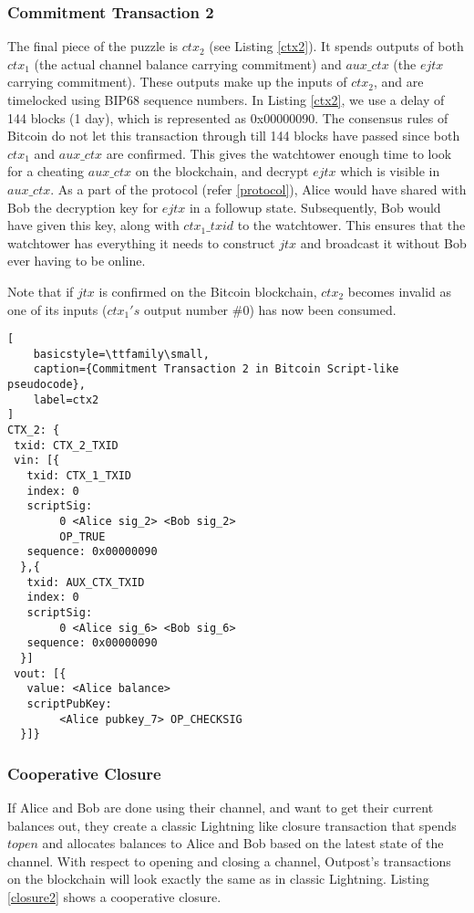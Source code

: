 \subsubsection{Commitment Transaction 2}
The final piece of the puzzle is $\mathit{ctx_2}$ (see Listing \ref{ctx2}). It spends outputs of both $\mathit{ctx_1}$ (the actual channel balance carrying commitment) and $\mathit{aux\_ctx}$ (the $\mathit{ejtx}$ carrying commitment). These outputs make up the inputs of $\mathit{ctx_2}$, and are timelocked using BIP68 \cite{BIP68} sequence numbers. In Listing \ref{ctx2}, we use a delay of 144 blocks (1 day), which is represented as 0x00000090. The consensus rules of Bitcoin do not let this transaction through till 144 blocks have passed since both $\mathit{ctx_1}$ and $\mathit{aux\_ctx}$ are confirmed. This gives the watchtower enough time to look for a cheating $\mathit{aux\_ctx}$ on the blockchain, and decrypt $\mathit{ejtx}$ which is visible in $\mathit{aux\_ctx}$. As a part of the protocol (refer \ref{protocol}), Alice would have shared with Bob the decryption key for $\mathit{ejtx}$ in a followup state. Subsequently, Bob would have given this key, along with $\mathit{ctx_1\_txid}$ to the watchtower. This ensures that the watchtower has everything it needs to construct $\mathit{jtx}$ and broadcast it without Bob ever having to be online. 

Note that if $\mathit{jtx}$ is confirmed on the Bitcoin blockchain, $\mathit{ctx_2}$ becomes invalid as one of its inputs ($\mathit{ctx_1's}$ output number \#0) has now been consumed. 

\begin{lstlisting}[
    basicstyle=\ttfamily\small,
    caption={Commitment Transaction 2 in Bitcoin Script-like pseudocode},
    label=ctx2
]
CTX_2: {
 txid: CTX_2_TXID
 vin: [{
   txid: CTX_1_TXID
   index: 0
   scriptSig: 
        0 <Alice sig_2> <Bob sig_2>
        OP_TRUE
   sequence: 0x00000090
  },{
   txid: AUX_CTX_TXID
   index: 0
   scriptSig: 
        0 <Alice sig_6> <Bob sig_6>
   sequence: 0x00000090
  }]
 vout: [{
   value: <Alice balance>
   scriptPubKey: 
        <Alice pubkey_7> OP_CHECKSIG
  }]}
\end{lstlisting}

\subsubsection{Cooperative Closure}
If Alice and Bob are done using their channel, and want to get their current balances out, they create a classic Lightning like closure transaction that spends $\mathit{topen}$ and allocates balances to Alice and Bob based on the latest state of the channel. With respect to opening and closing a channel, Outpost's transactions on the blockchain will look exactly the same as in classic Lightning. Listing \ref{closure2} shows a cooperative closure.

